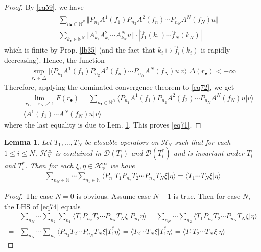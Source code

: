 \documentclass[12pt,b5paper,notitlepage]{article}
\theoremstyle{definition}
\theoremstyle{plain}
\newtheorem{lm}[df]{Lemma}
\newcommand{\wht}{\widehat}
\newcommand{\Dom}{\scr{D}}
\newcommand{\bk}[1]{\langle {#1}\rangle}
\newcommand{\bigbk}[1]{\big\langle {#1}\big\rangle}
\newcommand{\scr}{\mathscr}
\newcommand{\blt}{\bullet}
\newcommand{\Nbb}{\mathbb N}
\newcommand{\HV}{\mathcal H_{\mathbb V}}
\numberwithin{equation}{section}
\begin{document}
\begin{proof}
By \eqref{eq59}, we have
\begin{align*}
\begin{aligned}\label{eq73}
&\sum_{n_\blt\in\Nbb^N}\big\Vert P_{n_1}A^1(f_1)P_{n_2}A^2(f_n)\cdots P_{n_N}A^N(f_N)u\big\Vert\\
=&\sum_{k_\blt\in\Nbb^N}\big\Vert A^1_{k_1}A^2_{k_2}\cdots A^N_{k_N}u\big\Vert\cdot |\wht f_1(k_1)\cdots \wht f_N(k_N)|
\end{aligned}\tag{$\star$}
\end{align*}
which is finite by Prop. \ref{lb35} (and the fact that $k_i\mapsto\wht f_i(k_i)$ is rapidly decreasing). Hence, the function
\begin{align*}
\sup_{r_\blt\in\Delta}\Big|\bigbk{P_{n_1}A^1(f_1)P_{n_2}A^2(f_n)\cdots P_{n_N}A^N(f_N)u|v } \Big|\Delta(r_\blt)<+\infty
\end{align*}
Therefore, applying the dominated convergence theorem to \eqref{eq72}, we get
\begin{align*}
&\lim_{r_1,\dots,r_N\nearrow1}F(r_\blt)=\sum_{n_\blt\in\Nbb^N}\bk{P_{n_1}A^1(f_1)P_{n_2}A^2(f_2)\cdots P_{n_N}A^N(f_N)u|v}\\
=& \bk{A^1(f_1)\cdots A^N(f_N)u|v}
\end{align*}
where the last equality is due to Lem. \ref{lb47}. This proves \eqref{eq71}.
\end{proof}

\begin{lm}\label{lb47}
Let $T_1,\dots,T_N$ be closable operators on $\HV$ such that for each $1\leq i\leq N$, $\HV^\infty$ is contained in $\Dom(T_i)$ and $\Dom(T_i^*)$ and is invariant under $T_i$ and $T_i^*$. Then for each $\xi,\eta\in\HV^\infty$ we have
\begin{align}\label{eq74}
\sum_{n_N\in\Nbb}\cdots \sum_{n_1\in\Nbb}\bk{P_{n_1}T_1P_{n_2}T_2\cdots P_{n_N}T_N\xi|\eta}=\bk{T_1\cdots T_N\xi|\eta}
\end{align}
\end{lm}


\begin{proof}
The case $N=0$ is obvious. Assume case $N-1$ is true. Then for case $N$, the LHS of \eqref{eq74} equals
\begin{align*}
&\sum_{n_N}\cdots \sum_{n_2}\sum_{n_1}\bk{T_1P_{n_2}T_2\cdots P_{n_N}T_N\xi|P_{n_1}\eta}=\sum_{n_N}\cdots \sum_{n_2}\bk{T_1P_{n_2}T_2\cdots P_{n_N}T_N\xi|\eta}\\
=&\sum_{n_N}\cdots \sum_{n_2}\bk{P_{n_2}T_2\cdots P_{n_N}T_N\xi|T_1^*\eta}=\bk{T_2\cdots T_N\xi|T_1^*\eta}=\bk{T_1T_2\cdots T_N\xi|\eta}
\end{align*}
\end{proof}
\end{document}

